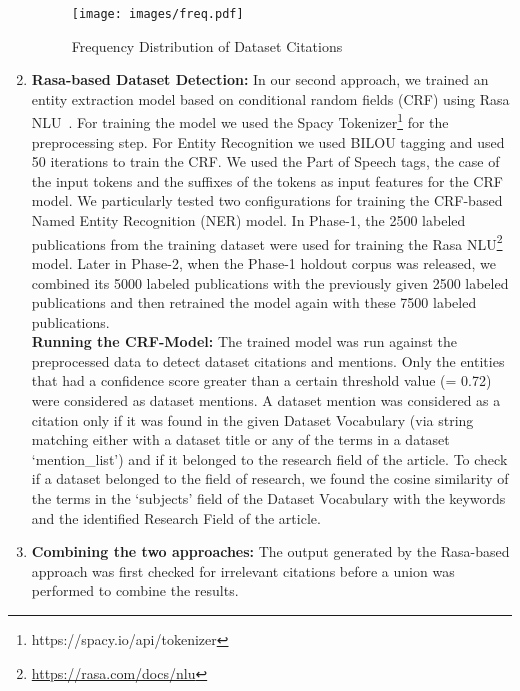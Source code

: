 \documentclass[runningheads]{llncs}
\begin{document}
\begin{enumerate}
\begin{figure}[!htb]
    \centering
    \texttt{[image: images/freq.pdf]}
    \caption{Frequency Distribution of Dataset Citations}
    \label{fig:graph}
\end{figure}

\item \textbf{Rasa-based Dataset Detection:}
In our second approach, we trained an entity extraction model based on conditional random fields (CRF) using Rasa NLU~\cite{DBLP:journals/corr/abs-1712-05181}. For training the model we used the Spacy Tokenizer\footnote{https://spacy.io/api/tokenizer} for the preprocessing step. For Entity Recognition we used BILOU tagging and used 50 iterations to train the CRF. We used the Part of Speech tags, the case of the input tokens and the suffixes of the tokens as input features for the CRF model. 
We particularly tested two configurations for training the CRF-based Named Entity Recognition (NER) model. In Phase-1, the 2500 labeled publications from the training dataset were used for training the Rasa NLU\footnote{\url{https://rasa.com/docs/nlu}} model. Later in Phase-2, when the Phase-1 holdout corpus was released, we combined its 5000 labeled publications with the previously given 2500 labeled publications and then retrained the model again with these 7500 labeled publications. %
\\
\textbf{Running the CRF-Model:} The trained model was run against the preprocessed data to detect dataset citations and mentions. Only the entities that had a confidence score greater than a certain threshold value (= 0.72) were considered as dataset mentions. A dataset mention was considered as a citation only if it was found in the given Dataset Vocabulary (via string matching either with a dataset title or any of the terms in a dataset `mention\_list') and if it belonged to the research field of the article. %
To check if a dataset belonged to the field of research, we found the cosine similarity of the terms in the ‘subjects’ field of the Dataset Vocabulary with the keywords and the identified Research Field of the article. 
\smallskip
\item \textbf{Combining the two approaches:}
The output generated by the Rasa-based approach was first checked for irrelevant citations before a union was performed to combine the results. 

\end{enumerate}
\end{document}
